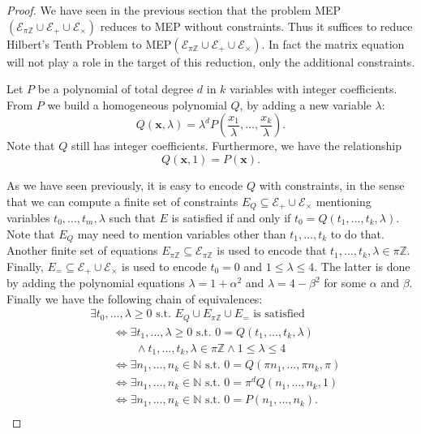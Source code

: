 \begin{proof}
  We have seen in the previous section that the problem
  MEP$(\mathcal{E}_{\pi\mathbb{Z}}\cup\mathcal{E}_{+}\cup\mathcal{E}_{\times})$
  reduces to MEP without constraints.  Thus it suffices to reduce
  Hilbert's Tenth Problem to
  MEP$(\mathcal{E}_{\pi\mathbb{Z}}\cup\mathcal{E}_{+}\cup\mathcal{E}_{\times})$.
  In fact the matrix equation will not play a role in the
  target of this reduction, only the additional constraints.

  Let $P$ be a polynomial of total degree $d$ in $k$ variables with
  integer coefficients. From $P$ we build a homogeneous polynomial $Q$, by
  adding a new variable $\lambda$:
  \[Q(\mathbf{x},\lambda)=\lambda^dP\left(\frac{x_1}{\lambda},\ldots,
    \frac{x_k}{\lambda}\right).\]
  Note that $Q$ still has integer coefficients. Furthermore, we have the relationship
\[Q(\mathbf{x},1)=P(\mathbf{x}).\]

As we have seen previously, it is easy to encode $Q$ with constraints,
in the sense that we can compute a finite set of constraints
$E_Q \subseteq \mathcal{E}_{+}\cup\mathcal{E}_{\times}$ mentioning variables 
$t_0,\ldots,t_m,\lambda$
such that $E$ is
satisfied if and only if $t_0=Q(t_1,\ldots,t_k,\lambda)$. Note that
$E_Q$ may need to mention variables other
than $t_1,\ldots,t_k$ to do that.  Another
finite set of equations
$E_{\pi\mathbb{Z}}\subseteq\mathcal{E}_{\pi\mathbb{Z}}$ is used to
encode that $t_1,\ldots,t_k,\lambda\in\pi\mathbb{Z}$. Finally,
$E_{=}\subseteq\mathcal{E}_{+}\cup\mathcal{E}_{\times}$ is used to
encode $t_{0}=0$ and $1\leqslant \lambda\leqslant4$.  The
latter is done by adding the polynomial equations $\lambda=1+\alpha^2$ and
$\lambda=4-\beta^2$ for some $\alpha$ and $\beta$. Finally we have the
following chain of equivalences:
\begin{align*}
&\exists t_0,\ldots,\lambda\geqslant0\text{ s.t. }E_Q\cup E_{\pi\mathbb{Z}}\cup E_{=}\text{ is satisfied }\\
&\qquad\Leftrightarrow\exists t_1,\ldots,\lambda\geqslant0\text{ s.t. } 0=Q(t_1,\ldots,t_k,\lambda)\\
    &\qquad\qquad\wedge t_1,\ldots,t_k,\lambda\in\pi\mathbb{Z}\wedge 1\leqslant\lambda\leqslant4\\
&\qquad\Leftrightarrow\exists n_1,\ldots,n_k\in\mathbb{N}\text{ s.t. } 0=Q(\pi n_1,\ldots,\pi n_k,\pi)\\
&\qquad\Leftrightarrow\exists n_1,\ldots,n_k\in\mathbb{N}\text{ s.t. } 0=\pi^d Q(n_1,\ldots,n_k,1)\\
&\qquad\Leftrightarrow\exists n_1,\ldots,n_k\in\mathbb{N}\text{ s.t. } 0=P(n_1,\ldots,n_k).\\
\end{align*}
\end{proof}